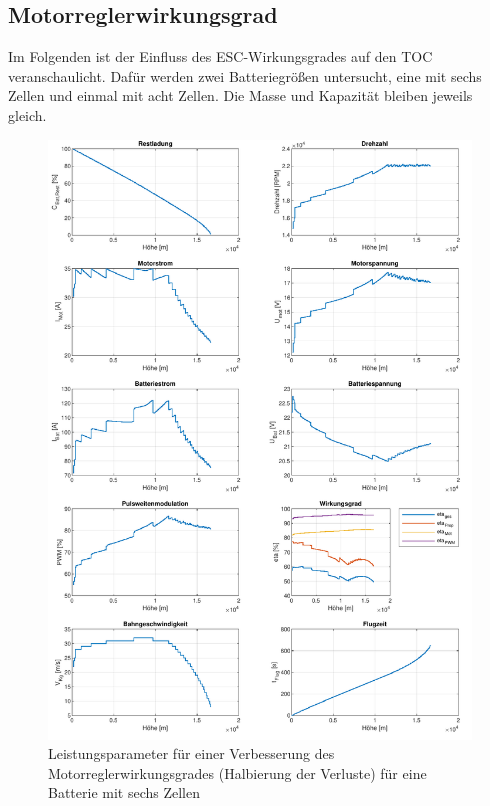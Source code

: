 \begin{appendix}
\section{Motorreglerwirkungsgrad}
\label{sec:motorreglerwirkungsgrad}
Im Folgenden ist der Einfluss des ESC-Wirkungsgrades auf den TOC veranschaulicht. Dafür werden zwei Batteriegrößen untersucht, eine mit sechs Zellen und einmal mit acht Zellen. Die Masse und Kapazität bleiben jeweils gleich. 
\begin{figure}[H]
\centering
	\includegraphics[scale=0.7]{Diagramme/Untersuchung_eta_pwm_halbierung_6.pdf}
	\caption{Leistungsparameter für einer Verbesserung des Motorreglerwirkungsgrades (Halbierung der Verluste) für eine Batterie mit sechs Zellen}
	\label{abb:eta_pwm_6_halb}
\end{figure}


\end{appendix}
